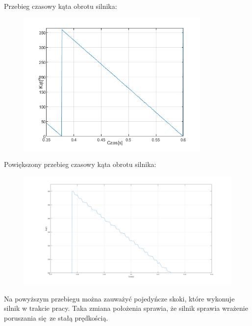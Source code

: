 \documentclass[a4paper, 12pt]{article}
\begin{document}
				Przebieg czasowy kąta obrotu silnika:
				\begin{figure}[H]
					\centering
					\includegraphics[width = 0.85\textwidth]{./pomiary/kat_od_czasu.png}
				\end{figure} \noindent
				Powiększony przebieg czasowy kąta obrotu silnika:
				\begin{figure}[H]
					\centering
					\includegraphics[width = \textwidth]{./pomiary/kat_od_czasu_blizej.png}
				\end{figure} \noindent
				Na powyższym przebiegu można zauważyć pojedyńcze skoki, które wykonuje silnik w trakcie pracy. Taka zmiana położenia sprawia, że silnik sprawia wrażenie poruszania się ze stałą prędkością.
\end{document}
